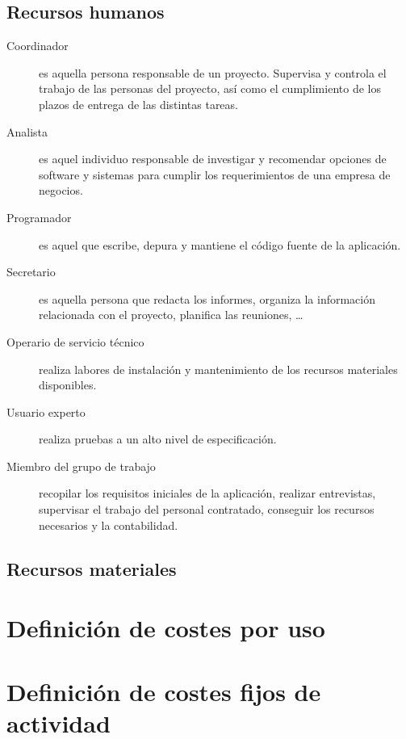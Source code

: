 \documentclass[11pt,a4paper,spanish,twoside]{report}
\begin{document}
\subsection{Recursos humanos}
\begin{description}
\item[Coordinador] es aquella persona responsable de un proyecto. Supervisa y
  controla el trabajo de las personas del proyecto, así como el cumplimiento
  de los plazos de entrega de las distintas tareas. 

\item[Analista] es aquel individuo responsable de investigar y
  recomendar opciones de software y sistemas para cumplir los requerimientos
  de una empresa de negocios.  

\item[Programador] es aquel que escribe, depura y mantiene el código fuente
  de la aplicación.  

\item[Secretario] es aquella persona que redacta los informes, organiza la
  información relacionada con el proyecto, planifica las reuniones, \dots

\item[Operario de servicio técnico] realiza labores de instalación y
  mantenimiento de los recursos materiales disponibles.

\item[Usuario experto] realiza pruebas a un alto nivel de especificación.

\item[Miembro del grupo de trabajo] recopilar los requisitos iniciales de la
  aplicación, realizar entrevistas, supervisar el trabajo del personal
  contratado, conseguir los recursos necesarios y la contabilidad.

\end{description}

\subsection{Recursos materiales}


\section{Definición de costes por uso}

\section{Definición de costes fijos de actividad}
\end{document}
